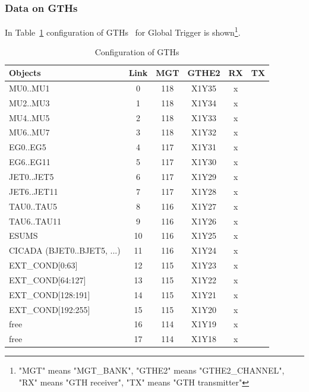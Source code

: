 \begin{longtable}{|l|c|c|c|c|c|c|c|l|}
\end{longtable}

\clearpage

\subsubsection{Data on GTHs}\label{sec:app:gth_conf_table}

In Table~\ref{tab:app:gth_conf} configuration of GTHs~\cite{GTHs} for Global Trigger is shown\footnote{"MGT" means "MGT\_BANK", "GTHE2" means "GTHE2\_CHANNEL", "RX" means "GTH receiver", "TX" means "GTH transmitter"}.

\begin{longtable}{|l|c|c|c|c|c|}
\caption{Configuration of GTHs}
    \label{tab:app:gth_conf}\\
\hline
\textbf{Objects}& \textbf{Link}& \textbf{MGT}& \textbf{GTHE2}& \textbf{RX}& \textbf{TX}\\
\hline
\hline
\endhead
MU0..MU1  & 0  & 118 & X1Y35 & x &   \\\hline
MU2..MU3  & 1  & 118 & X1Y34 & x &   \\\hline
MU4..MU5  & 2  & 118 & X1Y33 & x &   \\\hline
MU6..MU7  & 3  & 118 & X1Y32 & x &   \\\hline
EG0..EG5  & 4  & 117 & X1Y31 & x &   \\\hline
EG6..EG11 & 5  & 117 & X1Y30 & x &   \\\hline
JET0..JET5  & 6  & 117 & X1Y29 & x &   \\\hline
JET6..JET11 & 7  & 117 & X1Y28 & x &   \\\hline
TAU0..TAU5  & 8  & 116 & X1Y27 & x &   \\\hline
TAU6..TAU11 & 9  & 116 & X1Y26 & x &   \\\hline
ESUMS  & 10  & 116 & X1Y25 & x &   \\\hline
CICADA (BJET0..BJET5, ...)& 11  & 116 & X1Y24 & x &   \\\hline
EXT\_COND[0:63] & 12  & 115 & X1Y23 & x &   \\\hline
EXT\_COND[64:127] & 13  & 115 & X1Y22 & x &   \\\hline
EXT\_COND[128:191] & 14  & 115 & X1Y21 & x &   \\\hline
EXT\_COND[192:255] & 15  & 115 & X1Y20 & x &   \\\hline
free & 16  & 114 & X1Y19 & x &   \\\hline
free & 17  & 114 & X1Y18 & x &   \\\hline

\end{longtable}
